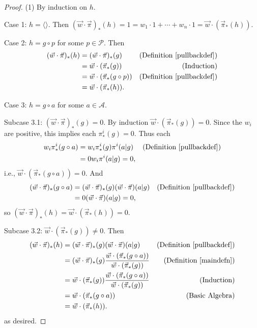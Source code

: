 \documentclass[runningheads]{llncs}
\begin{document}
\begin{proof}
    (1) By induction on $h$.

    Case 1: $h=\langle\rangle$. Then
    $(\vec w\cdot\vec\pi)_*(h)=1=w_1\cdot 1+\cdots+w_n\cdot 1
    =\vec w\cdot (\vec\pi_*(h))$.

    Case 2: $h=g\circ p$ for some $p\in\mathcal P$. Then
    \begin{align*}
        (\vec w\cdot \vec\pi)_*(h)
            &= (\vec w\cdot\vec\pi)_*(g)
                &\mbox{(Definition \ref{pullbackdef})}\\
            &= \vec w\cdot(\vec\pi_*(g))
                &\mbox{(Induction)}\\
            &= \vec w\cdot(\vec\pi_*(g\circ p))
                &\mbox{(Definition \ref{pullbackdef})}\\
            &= \vec w\cdot(\vec\pi_*(h)).
    \end{align*}

    Case 3: $h=g\circ a$ for some $a\in\mathcal A$.

    Subcase 3.1: $(\vec w\cdot \vec\pi)_*(g)=0$.
        By induction $\vec w\cdot(\vec\pi_*(g))=0$.
        Since the $w_i$ are positive, this implies
        each $\pi^i_*(g)=0$.
        Thus each
        \begin{align*}
            w_i\pi^i_*(g\circ a)
                &= w_i\pi^i_*(g)\pi^i(a|g)
                    &\mbox{(Definition \ref{pullbackdef})}\\
                &= 0w_i\pi^i(a|g)=0,
        \end{align*}
        i.e., $\vec w\cdot(\vec\pi_*(g\circ a))=0$.
        And
        \begin{align*}
            (\vec w\cdot\vec\pi)_*(g\circ a)
                &= (\vec w\cdot\vec\pi)_*(g)(\vec w\cdot\vec\pi)(a|g)
                    &\mbox{(Definition \ref{pullbackdef})}\\
                &= 0(\vec w\cdot\vec\pi)(a|g) = 0,
        \end{align*}
        so $(\vec w\cdot\vec\pi)_*(h)=\vec w\cdot(\vec \pi_*(h))=0$.

    Subcase 3.2: $\vec w\cdot (\vec\pi_*(g))\not=0$. Then
    \begin{align*}
        (\vec w\cdot\vec\pi)_*(h)
            &= (\vec w\cdot\vec\pi)_*(g)(\vec w\cdot\vec\pi)(a|g)
                &\mbox{(Definition \ref{pullbackdef})}\\
            &= (\vec w\cdot\vec\pi)_*(g)
                \frac
                {\vec w\cdot(\vec\pi_*(g\circ a))}
                {\vec w\cdot(\vec\pi_*(g))}
                &\mbox{(Definition \ref{maindefn})}\\
            &= \vec w\cdot(\vec\pi_*(g))
                \frac
                {\vec w\cdot(\vec\pi_*(g\circ a))}
                {\vec w\cdot(\vec\pi_*(g))}
                &\mbox{(Induction)}\\
            &= \vec w\cdot(\vec\pi_*(g\circ a))
                &\mbox{(Basic Algebra)}\\
            &= \vec w\cdot(\vec\pi_*(h)).
    \end{align*}
    as desired.


\end{proof}
\end{document}
